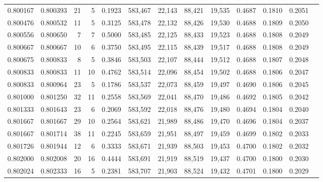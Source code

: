 \begin{tabular}{rrrrrrrrrrrrr}
0.800167 & 0.800393 &    21 &   5 &                                     0.1923 & 583,467 &  22,143 &  88,421 &  19,535 & 0.4687 & 0.1810 & 0.2051 \\
0.800476 & 0.800532 &    11 &   5 &                                     0.3125 & 583,478 &  22,132 &  88,426 &  19,530 & 0.4688 & 0.1809 & 0.2050 \\
0.800556 & 0.800650 &     7 &   7 &                                     0.5000 & 583,485 &  22,125 &  88,433 &  19,523 & 0.4688 & 0.1808 & 0.2049 \\
0.800667 & 0.800667 &    10 &   6 &                                     0.3750 & 583,495 &  22,115 &  88,439 &  19,517 & 0.4688 & 0.1808 & 0.2049 \\
0.800675 & 0.800833 &     8 &   5 &                                     0.3846 & 583,503 &  22,107 &  88,444 &  19,512 & 0.4688 & 0.1807 & 0.2048 \\
0.800833 & 0.800833 &    11 &  10 &                                     0.4762 & 583,514 &  22,096 &  88,454 &  19,502 & 0.4688 & 0.1806 & 0.2047 \\
0.800833 & 0.800964 &    23 &   5 &                                     0.1786 & 583,537 &  22,073 &  88,459 &  19,497 & 0.4690 & 0.1806 & 0.2045 \\
0.801000 & 0.801250 &    32 &  11 &                                     0.2558 & 583,569 &  22,041 &  88,470 &  19,486 & 0.4692 & 0.1805 & 0.2042 \\
0.801333 & 0.801643 &    23 &   6 &                                     0.2069 & 583,592 &  22,018 &  88,476 &  19,480 & 0.4694 & 0.1804 & 0.2040 \\
0.801667 & 0.801667 &    29 &  10 &                                     0.2564 & 583,621 &  21,989 &  88,486 &  19,470 & 0.4696 & 0.1804 & 0.2037 \\
0.801667 & 0.801714 &    38 &  11 &                                     0.2245 & 583,659 &  21,951 &  88,497 &  19,459 & 0.4699 & 0.1802 & 0.2033 \\
0.801726 & 0.801944 &    12 &   6 &                                     0.3333 & 583,671 &  21,939 &  88,503 &  19,453 & 0.4700 & 0.1802 & 0.2032 \\
0.802000 & 0.802008 &    20 &  16 &                                     0.4444 & 583,691 &  21,919 &  88,519 &  19,437 & 0.4700 & 0.1800 & 0.2030 \\
0.802024 & 0.802333 &    16 &   5 &                                     0.2381 & 583,707 &  21,903 &  88,524 &  19,432 & 0.4701 & 0.1800 & 0.2029 \\

\end{tabular}
